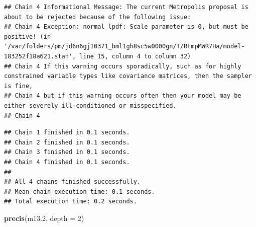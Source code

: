 \documentclass[
]{article}
\newenvironment{Shaded}{\begin{snugshade}}{\end{snugshade}}
\newcommand{\AttributeTok}[1]{\textcolor[rgb]{0.13,0.29,0.53}{#1}}
\newcommand{\DecValTok}[1]{\textcolor[rgb]{0.00,0.00,0.81}{#1}}
\newcommand{\FloatTok}[1]{\textcolor[rgb]{0.00,0.00,0.81}{#1}}
\newcommand{\FunctionTok}[1]{\textcolor[rgb]{0.13,0.29,0.53}{\textbf{#1}}}
\newcommand{\NormalTok}[1]{#1}
\begin{document}
\begin{verbatim}
## Chain 4 Informational Message: The current Metropolis proposal is about to be rejected because of the following issue:
## Chain 4 Exception: normal_lpdf: Scale parameter is 0, but must be positive! (in '/var/folders/pm/jd6n6gj10371_bml1gh8sc5w0000gn/T/RtmpMWR7Ha/model-183252f18a621.stan', line 15, column 4 to column 32)
## Chain 4 If this warning occurs sporadically, such as for highly constrained variable types like covariance matrices, then the sampler is fine,
## Chain 4 but if this warning occurs often then your model may be either severely ill-conditioned or misspecified.
## Chain 4
\end{verbatim}

\begin{verbatim}
## Chain 1 finished in 0.1 seconds.
## Chain 2 finished in 0.1 seconds.
## Chain 3 finished in 0.1 seconds.
## Chain 4 finished in 0.1 seconds.
## 
## All 4 chains finished successfully.
## Mean chain execution time: 0.1 seconds.
## Total execution time: 0.2 seconds.
\end{verbatim}

\begin{Shaded}
\begin{Highlighting}[]
\FunctionTok{precis}\NormalTok{(m13}\FloatTok{.2}\NormalTok{, }\AttributeTok{depth =} \DecValTok{2}\NormalTok{)}
\end{Highlighting}
\end{Shaded}
\end{document}
